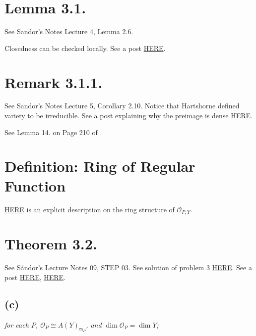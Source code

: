 \section{Lemma 3.1.}

See Sandor's Notes Lecture 4, Lemma 2.6.

Closedness can be checked locally. See a post \href{https://math.stackexchange.com/questions/717382/how-to-prove-that-z-is-closed-subset-iff-x-can-be-covered-by-open-subsets}{HERE}.

\section{Remark 3.1.1.}

See Sandor's Notes Lecture 5, Corollary 2.10.
Notice that Hartshorne defined variety to be irreducible.
See a post explaining why the preimage is dense \href{https://math.stackexchange.com/questions/2860498/regular-functions-are-determined-only-up-to-open-sets#:~:text=An%20important%20consequence%20of%20this,dense%2C%20hence%20equal%20to%20X.}{HERE}.

See Lemma 14. on Page 210 of \cite{bosch2013algebraic}.

\section{Definition: Ring of Regular Function}
\href{https://www2.math.ethz.ch/education/bachelor/lectures/fs2016/math/alg_geom/Solution8.pdf}{HERE} is an explicit description on the ring structure of $\mathcal O_{P,Y}$.

\section{Theorem 3.2.}

See S\'andor's Lecture Notes 09, STEP 03.
See solution of problem 3 \href{https://www2.math.ethz.ch/education/bachelor/lectures/fs2016/math/alg_geom/Solution8.pdf}{HERE}.
See a post \href{https://math.stackexchange.com/questions/1337842/with-regards-to-theorem-3-2-in-hartshorne-are-regular-functions-on-a-variety-si}{HERE}, \href{https://math.stackexchange.com/questions/1909153/some-questions-on-hartshornes-theorem-i-3-2}{HERE}.

\subsection{(c)}
\textit{for each $P$, $\mathcal O_P\cong A(Y)_{\mathfrak m _P}$, and $\operatorname{dim}\mathcal O_P=\operatorname{dim} Y$; }

